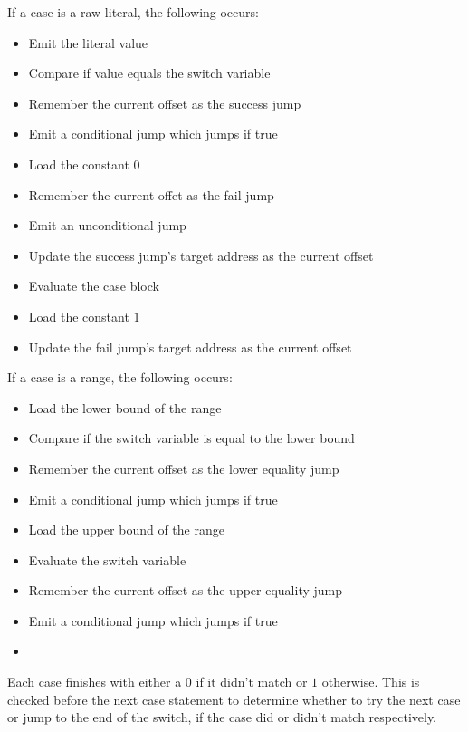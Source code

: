 \documentclass[11pt]{article}
\begin{document}
    If a case is a raw literal, the following occurs:
    \begin{itemize}
        \item Emit the literal value
        \item Compare if value equals the switch variable
        \item Remember the current offset as the success jump
        \item Emit a conditional jump which jumps if true
        \item Load the constant \(0\)
        \item Remember the current offet as the fail jump
        \item Emit an unconditional jump
        \item Update the success jump's target address as the current offset
        \item Evaluate the case block
        \item Load the constant \(1\)
        \item Update the fail jump's target address as the current offset
    \end{itemize}
    If a case is a range, the following occurs:
    \begin{itemize}
        \item Load the lower bound of the range
        \item Compare if the switch variable is equal to the lower bound
        \item Remember the current offset as the lower equality jump
        \item Emit a conditional jump which jumps if true
        \item Load the upper bound of the range
        \item Evaluate the switch variable
        \item Remember the current offset as the upper equality jump
        \item Emit a conditional jump which jumps if true
        \item
    \end{itemize}
    Each case finishes with either a \(0\) if it didn't match or \(1\) otherwise.
    This is checked before the next case statement to determine whether to try the next case or jump to the end of the
    switch, if the case did or didn't match respectively.
\end{document}

